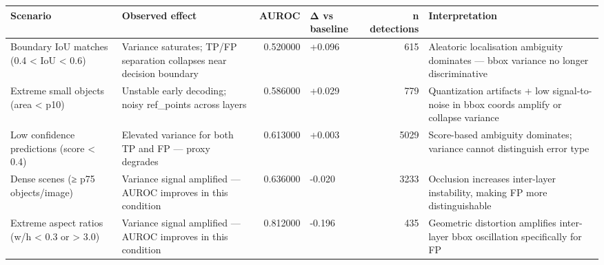 \begin{tabular}{llrlrl}
\toprule
Scenario & Observed effect & AUROC & Δ vs baseline & n detections & Interpretation \\
\midrule
Boundary IoU matches (0.4 < IoU < 0.6) & Variance saturates; TP/FP separation collapses near decision boundary & 0.520000 & +0.096 & 615 & Aleatoric localisation ambiguity dominates — bbox variance no longer discriminative \\
Extreme small objects (area < p10) & Unstable early decoding; noisy ref\_points across layers & 0.586000 & +0.029 & 779 & Quantization artifacts + low signal-to-noise in bbox coords amplify or collapse variance \\
Low confidence predictions (score < 0.4) & Elevated variance for both TP and FP — proxy degrades & 0.613000 & +0.003 & 5029 & Score-based ambiguity dominates; variance cannot distinguish error type \\
Dense scenes (≥ p75 objects/image) & Variance signal amplified — AUROC improves in this condition & 0.636000 & -0.020 & 3233 & Occlusion increases inter-layer instability, making FP more distinguishable \\
Extreme aspect ratios (w/h < 0.3 or > 3.0) & Variance signal amplified — AUROC improves in this condition & 0.812000 & -0.196 & 435 & Geometric distortion amplifies inter-layer bbox oscillation specifically for FP \\
\bottomrule
\end{tabular}
